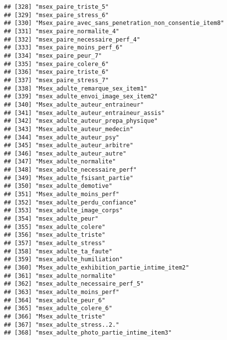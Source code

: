 \documentclass[
]{article}
\begin{document}
\begin{verbatim}
## [328] "msex_paire_triste_5"                                 
## [329] "msex_paire_stress_6"                                 
## [330] "Msex_paire_avec_sans_penetration_non_consentie_item8"
## [331] "msex_paire_normalite_4"                              
## [332] "msex_paire_necessaire_perf_4"                        
## [333] "msex_paire_moins_perf_6"                             
## [334] "msex_paire_peur_7"                                   
## [335] "msex_paire_colere_6"                                 
## [336] "msex_paire_triste_6"                                 
## [337] "msex_paire_stress_7"                                 
## [338] "Msex_adulte_remarque_sex_item1"                      
## [339] "msex_adulte_envoi_image_sex_item2"                   
## [340] "Msex_adulte_auteur_entraineur"                       
## [341] "msex_adulte_auteur_entraineur_assis"                 
## [342] "msex_adulte_auteur_prepa_physique"                   
## [343] "Msex_adulte_auteur_medecin"                          
## [344] "msex_adulte_auteur_psy"                              
## [345] "msex_adulte_auteur_arbitre"                          
## [346] "msex_adulte_auteur_autre"                            
## [347] "Msex_adulte_normalite"                               
## [348] "msex_adulte_necessaire_perf"                         
## [349] "Msex_adulte_fsisant_partie"                          
## [350] "msex_adulte_demotive"                                
## [351] "Msex_adulte_moins_perf"                              
## [352] "msex_adulte_perdu_confiance"                         
## [353] "msex_adulte_image_corps"                             
## [354] "msex_adulte_peur"                                    
## [355] "msex_adulte_colere"                                  
## [356] "msex_adulte_triste"                                  
## [357] "msex_adulte_stress"                                  
## [358] "msex_adulte_ta_faute"                                
## [359] "msex_adulte_humiliation"                             
## [360] "Msex_adulte_exhibition_partie_intime_item2"          
## [361] "msex_adulte_normalite"                               
## [362] "msex_adulte_necessaire_perf_5"                       
## [363] "msex_adulte_moins_perf"                              
## [364] "msex_adulte_peur_6"                                  
## [365] "msex_adulte_colere_6"                                
## [366] "Msex_adulte_triste"                                  
## [367] "msex_adulte_stress..2."                              
## [368] "msex_adulte_photo_partie_intime_item3"               

\end{verbatim}
\end{document}
